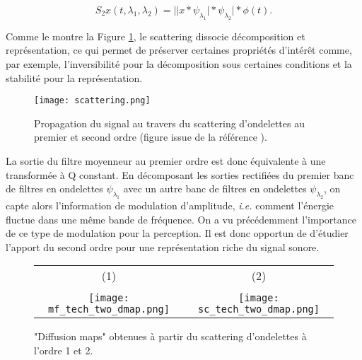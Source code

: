 \begin{equation}
S_2{x}(t, \lambda_1, \lambda_2)
= \vert \vert {x} \ast {\psi_{\lambda_1}} \vert \ast {\psi_{\lambda_2}} \vert \ast \phi(t)\mbox{.}
\end{equation}

Comme le montre la Figure \ref{fig:scat}, le scattering dissocie décomposition et représentation, ce qui permet de préserver certaines propriétés d'intérêt comme, par exemple, l'inversibilité pour la décomposition sous certaines conditions et la stabilité pour la représentation.

\begin{figure}[t]
  \texttt{[image: scattering.png]}
  \caption{Propagation du signal au travers du scattering d'ondelettes au premier et second ordre (figure issue de la référence ).}
  \label{fig:scat}
\end{figure}

La sortie du filtre moyenneur au premier ordre est donc équivalente à une transformée à Q constant. En décomposant les sorties rectifiées du premier banc de filtres en ondelettes $\psi_{\lambda_1}$ avec un autre banc de filtres en ondelettes $\psi_{\lambda_2}$, on capte alors l'information de modulation d'amplitude, \textit{i.e.} comment l'énergie fluctue dans une même bande de fréquence. On a vu précédemment l'importance de ce type de modulation pour la perception. Il est donc opportun de d'étudier l'apport du second ordre pour une représentation riche du signal sonore.  %


\begin{figure*}[t]
  \begin{tabular}{cc}
    (1)  &   (2)\\ \\
      \texttt{[image: mf\_tech\_two\_dmap.png]} &
      \texttt{[image: sc\_tech\_two\_dmap.png]}
  \end{tabular}
  \begin{center}
  \end{center}
  \label{fig:dm}
  \caption{"Diffusion maps" obtenues à partir du scattering d'ondelettes à l'ordre 1 et 2.}
\end{figure*}


